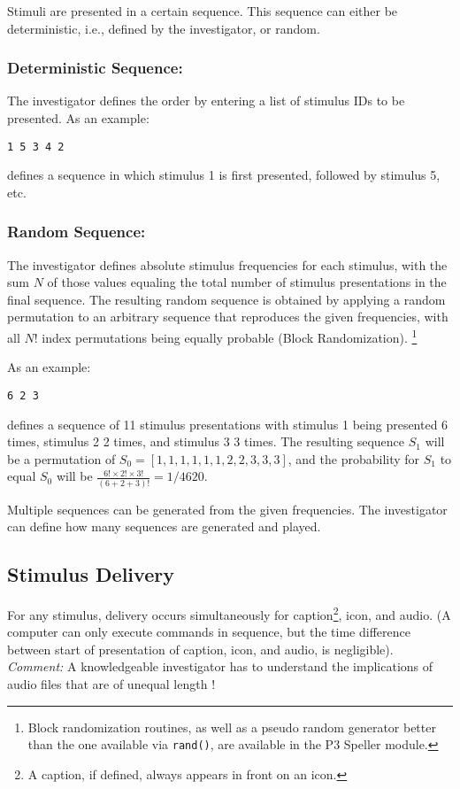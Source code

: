 \documentclass[letterpaper,oneside,12pt]{article}
\begin{document}
Stimuli are presented in a certain sequence. This sequence can either be 
deterministic, i.e., defined by the investigator, or random. 

\subsubsection{Deterministic Sequence:}The investigator defines the order by 
entering a list of stimulus IDs to be presented. As an example: 
\begin{verbatim} 
1 5 3 4 2 
\end{verbatim} 
defines a sequence in which stimulus 1 is first presented, followed by 
stimulus 5, etc.

\subsubsection{Random Sequence:}The investigator defines absolute stimulus 
frequencies for each stimulus, with the sum $N$ of those values equaling the total
number of stimulus presentations in the final sequence. The resulting random
sequence is obtained by applying a random permutation to an arbitrary sequence
that reproduces the given frequencies, with all $N!$ index permutations being
equally probable (Block Randomization).
\footnote{Block randomization routines, as well as a pseudo random generator better
than the one available via \texttt{rand()}, are available in the P3 Speller module.}

As an example: 
\begin{verbatim} 
6 2 3
\end{verbatim} 
defines a sequence of 11 stimulus presentations with stimulus 1 being presented 6
times, stimulus 2 2 times, and stimulus 3 3 times. The resulting sequence $S_1$ will
be a permutation of $S_0 = [1, 1, 1, 1, 1, 1, 2, 2, 3, 3, 3]$, and the probability
for $S_1$ to equal $S_0$ will be
$\frac{6!\times2!\times3!}{(6+2+3)!}=1/4620$.

Multiple sequences can be generated from the given frequencies.
The investigator can define how many sequences are generated and played.

\subsection{Stimulus Delivery}

For any stimulus, delivery occurs simultaneously for caption\footnote{A caption, 
if defined, always appears in front on an icon.}, icon, and audio. (A computer 
can only execute commands in sequence, but the time difference between start of 
presentation of caption, icon, and audio, is negligible). \emph{Comment:} A 
knowledgeable investigator has to understand the implications of audio files 
that are of unequal length !
\end{document}
